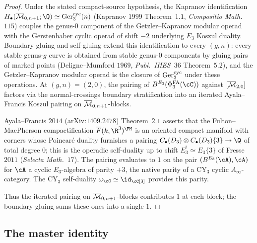 \begin{proof}
Under the stated compact-source hypothesis, the Kapranov identification
$H_\bullet(\Mbar_{0, n + 1}; \Q) \simeq \Ger_3^{\mathrm{cyc}}(n)$
(Kapranov $1999$ Theorem~$1.1$, \emph{Compositio Math.}~$115$) couples
the genus-$0$ component of the Getzler--Kapranov modular operad with
the Gerstenhaber cyclic operad of shift $-2$ underlying $E_3$ Koszul
duality. Boundary gluing and self-gluing extend this identification
to every $(g, n)$: every stable genus-$g$ curve is obtained from stable
genus-$0$ components by gluing pairs of marked points (Deligne--Mumford
$1969$, \emph{Publ.~IHES}~$36$ Theorem~$5.2$), and the Getzler--Kapranov
modular operad is the closure of $\mathrm{Ger}_3^{\mathrm{cyc}}$ under these
operations. At $(g, n) = (2, 0)$, the pairing of $B^{E_3}(\PhiFA_3(\cC))$
against $[\overline{\mathcal{M}}_{2, 0}]$ factors via the normal-crossings
boundary stratification into an iterated Ayala--Francis Koszul pairing
on $\overline{\mathcal{M}}_{0, n + 1}$-blocks.

Ayala--Francis $2014$ (arXiv:$1409.2478$) Theorem~$2.1$ asserts that
the Fulton--MacPherson compactification $\overline{F}(k, \R^3)^{\FM}$
is an oriented compact manifold with corners whose Poincar\'e duality
furnishes a pairing $C_\bullet(D_3) \otimes C_\bullet(D_3)\{3\} \to \Q$
of total degree $0$; this is the operadic self-duality up to shift
$E_3^! \simeq E_3\{3\}$ of Fresse $2011$ (\emph{Selecta
Math.}~$17$). The pairing evaluates to $1$ on the pair
$(B^{E_3}(\cA), \cA)$ for $\cA$ a cyclic $E_3$-algebra of parity $+3$,
the native parity of a CY$_3$ cyclic $A_\infty$-category. The
CY$_3$ self-duality $\omega_\cC \simeq \id_\cC[3]$ provides this parity.

Thus the iterated pairing on $\overline{\mathcal{M}}_{0, n + 1}$-blocks contributes $1$
at each block; the boundary gluing sums these ones into a single $1$.
\end{proof}

\subsection{The master identity}
\label{subsec:chain-master-identity}

